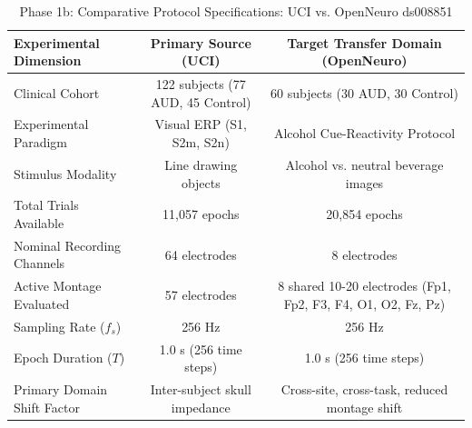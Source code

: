 \begin{table}[t]
\centering
\caption{Phase 1b: Comparative Protocol Specifications: UCI vs. OpenNeuro ds008851}
\label{tab:phase1b_comparison}
\begin{tabular}{lcc}
\hline
\textbf{Experimental Dimension} & \textbf{Primary Source (UCI)} & \textbf{Target Transfer Domain (OpenNeuro)} \\
\hline
Clinical Cohort & 122 subjects (77 AUD, 45 Control) & 60 subjects (30 AUD, 30 Control) \\
Experimental Paradigm & Visual ERP (S1, S2m, S2n) & Alcohol Cue-Reactivity Protocol \\
Stimulus Modality & Line drawing objects & Alcohol vs. neutral beverage images \\
Total Trials Available & 11,057 epochs & 20,854 epochs \\
Nominal Recording Channels & 64 electrodes & 8 electrodes \\
Active Montage Evaluated & 57 electrodes & 8 shared 10-20 electrodes (Fp1, Fp2, F3, F4, O1, O2, Fz, Pz) \\
Sampling Rate ($f_s$) & 256 Hz & 256 Hz \\
Epoch Duration ($T$) & 1.0 s (256 time steps) & 1.0 s (256 time steps) \\
Primary Domain Shift Factor & Inter-subject skull impedance & Cross-site, cross-task, reduced montage shift \\
\hline
\end{tabular}
\end{table}